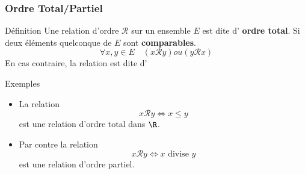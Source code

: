 \documentclass[usenames,dvipsnames]{beamer}
\begin{document}
 \begin{frame}[<+->]
   \frametitle{Ordre Total/Partiel}
  \begin{block}{Définition}
    Une relation d'ordre $\mathcal{R}$ sur un ensemble $E$ est dite d'
    \textbf{\alert{ordre total}}. Si deux éléments quelconque de $E$ sont
    \textbf{comparables}.
    \begin{equation}
      \forall x, y \in E\quad (x\mathcal{R} y) ou \left( y \mathcal{R} x\right)
    \end{equation}
    En cas contraire, la relation est dite d'
  \end{block} 

  \begin{block}{Exemples}
    \begin{itemize}
      \small
      \item La relation $$x\mathcal{R}y \iff x\leq y$$ est une relation d'ordre
          total dans $\R$.
      \item Par contre la relation $$x\mathcal{R}y \iff x\text{ divise } y$$ est
          une relation d'ordre partiel.
    \end{itemize} 
  \end{block}
 \end{frame}
\end{document}
